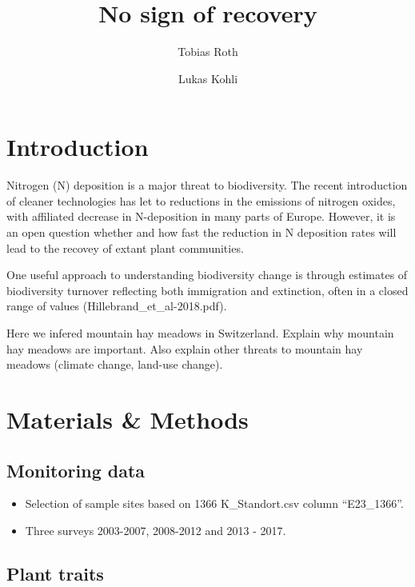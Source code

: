 \documentclass[fleqn,10pt,lineno]{wlpeerj} %
\title{No sign of recovery}
\author[1, 2]{Tobias Roth}
\author[2]{Lukas Kohli}
\affil[1]{Zoological Institute, University of Basel, Basel, Switzerland}
\affil[2]{Hintermann Weber AG, Austrasse 2a, 4153 Reinach, Switzerland}
\providecommand{\tightlist}{
\setlength{\itemsep}{0pt}\setlength{\parskip}{0pt}}
\theoremstyle{definition}
\theoremstyle{definition}
\theoremstyle{definition}
\theoremstyle{remark}
\begin{document}
\flushbottom
\maketitle
\thispagestyle{empty}

\section*{Introduction}\label{introduction}

Nitrogen (N) deposition is a major threat to biodiversity. The recent
introduction of cleaner technologies has let to reductions in the
emissions of nitrogen oxides, with affiliated decrease in N-deposition
in many parts of Europe. However, it is an open question whether and how
fast the reduction in N deposition rates will lead to the recovey of
extant plant communities.

One useful approach to understanding biodiversity change is through
estimates of biodiversity turnover reflecting both immigration and
extinction, often in a closed range of values
(Hillebrand\_et\_al-2018.pdf).

Here we infered mountain hay meadows in Switzerland. Explain why
mountain hay meadows are important. Also explain other threats to
mountain hay meadows (climate change, land-use change).

\section*{Materials \& Methods}\label{materials-methods}

\subsection*{Monitoring data}\label{monitoring-data}

\begin{itemize}
\tightlist
\item
  Selection of sample sites based on 1366 K\_Standort.csv column
  ``E23\_1366''.
\item
  Three surveys 2003-2007, 2008-2012 and 2013 - 2017.
\end{itemize}

\subsection*{Plant traits}\label{plant-traits}
\end{document}
